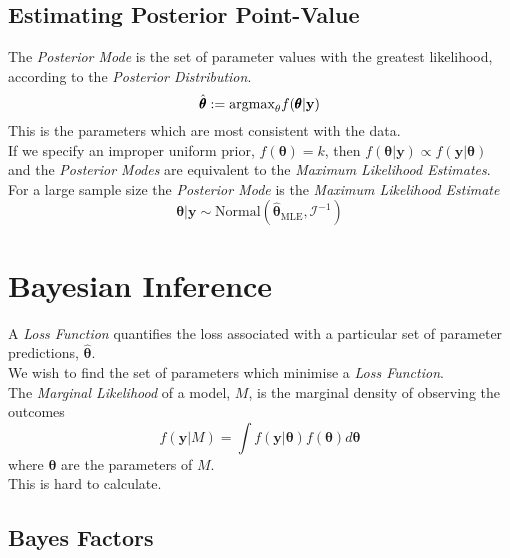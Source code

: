 \documentclass[11pt,a4paper]{article}
\begin{document}
\subsection{Estimating Posterior Point-Value}

The \textit{Posterior Mode} is the set of parameter values with the greatest likelihood, according to the \textit{Posterior Distribution}.
$$\hat{\pmb\theta}:=\text{argmax}_\theta f(\pmb\theta|\textbf{y})$$
\nb This is the parameters which are most consistent with the data.\\

If we specify an improper uniform prior, $f(\pmb\theta)=k$, then $f(\pmb\theta|\textbf{y})\propto f(\textbf{y}|\pmb\theta)$ and the \textit{Posterior Modes} are equivalent to the \textit{Maximum Likelihood Estimates}.\\

For a large sample size the \textit{Posterior Mode} is the \textit{Maximum Likelihood Estimate}
$$\pmb\theta|\textbf{y}\sim\text{Normal}(\hat{\pmb\theta}_\text{MLE},\mathcal{I}^{-1})$$

\section{Bayesian Inference}

A \textit{Loss Function} quantifies the loss associated with a particular set of parameter predictions, $\hat{\pmb\theta}$.\\
We wish to find the set of parameters which minimise a \textit{Loss Function}.\\

The \textit{Marginal Likelihood} of a model, $M$, is the marginal density of observing the outcomes
$$f(\textbf{y}|M)=\int f(\textbf{y}|\pmb\theta)f(\pmb\theta)d\pmb\theta$$
where $\pmb\theta$ are the parameters of $M$.\\
\nb This is hard to calculate.\\


\subsection{Bayes Factors}
\end{document}

